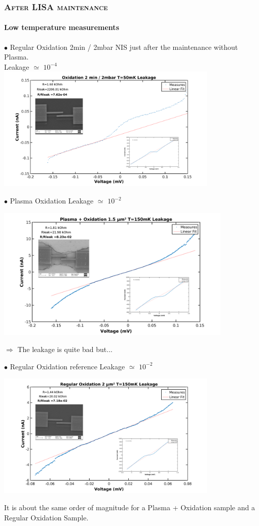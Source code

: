 \documentclass[handout]{beamer}
\begin{document}
    \begin{frame}[allowframebreaks]
        \frametitle{\textsc{After LISA maintenance}}
        \framesubtitle{Low temperature measurements}
        
        $\bullet$  Regular Oxidation 2min / 2mbar NIS just after the maintenance without Plasma.\\
        \hspace{4.7cm} Leakage $\simeq$ $10^{-4}$
        \includegraphics[width=300pt]{AfterLISAOx.png}
        \vspace{0.5cm}
        
        $\bullet$ Plasma Oxidation \hspace{1.8cm} Leakage $\simeq$ $10^{-2}$
        
        \includegraphics[width=320pt]{PlasmaOx.png}
                
        $\Longrightarrow$ The leakage is quite bad but...
        \vspace{0.5cm}
        
        $\bullet$ Regular Oxidation reference \hspace{1cm} Leakage $\simeq$ $10^{-2}$
        
        \includegraphics[width=300pt]{RegularOxRef.png}
        
        It is about the same order of magnitude for a Plasma + Oxidation sample and a Regular Oxidation Sample.

    \end{frame}
\end{document}
